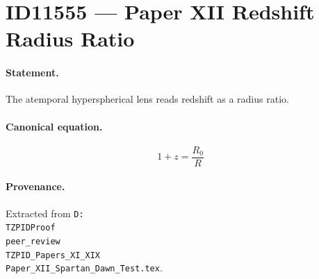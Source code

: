 \section*{ID11555 --- Paper XII Redshift Radius Ratio}

\paragraph{Statement.}
The atemporal hyperspherical lens reads redshift as a radius ratio.

\paragraph{Canonical equation.}
\[
1+z=\frac{R_0}{R}
\]

\paragraph{Provenance.}
Extracted from \texttt{D:\\TZPIDProof\\peer\_review\\TZPID\_Papers\_XI\_XIX\\Paper\_XII\_Spartan\_Dawn\_Test.tex}.
